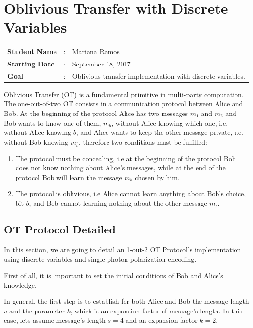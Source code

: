 \clearpage
\section{Oblivious Transfer with Discrete Variables}

\begin{tcolorbox}	
\begin{tabular}{p{2.75cm} p{0.2cm} p{10.5cm}} 	
\textbf{Student Name}  &:& Mariana Ramos\\
\textbf{Starting Date} &:& September 18, 2017\\
\textbf{Goal}          &:& Oblivious transfer implementation with discrete variables.
\end{tabular}
\end{tcolorbox}

Oblivious Transfer (OT) is a fundamental primitive in multi-party computation. The one-out-of-two OT consists in a communication protocol between Alice and Bob. At the beginning of the protocol Alice has two messages $m_1$ and $m_2$ and Bob wants to know one of them, $m_b$, without Alice knowing which one, i.e. without Alice knowing $b$, and Alice wants to keep the other message private, i.e. without Bob knowing $m_{\bar{b}}$. therefore two conditions must be fulfilled:
\begin{enumerate}
	\item{The protocol must be concealing, i.e at the beginning of the protocol Bob does not know nothing about Alice's messages, while at the end of the protocol Bob will learn the message $m_{b}$ chosen by him.}
	\item{The protocol is oblivious, i.e Alice cannot learn anything about Bob's choice, bit $b$, and Bob cannot learning nothing about the other message $m_{\bar{b}}$.}
\end {enumerate}

\subsection{OT Protocol Detailed}
In this section, we are going to detail an 1-out-2 OT Protocol's implementation using discrete variables and single photon polarization encoding.

 First of all, it is important to set the initial conditions of Bob and Alice's knowledge.

In general, the first step is to establish for both Alice and Bob the message length $s$ and the parameter $k$, which is an expansion factor of message's length.
In this case, lets assume message's length $s=4$ and an expansion factor $k=2$.

